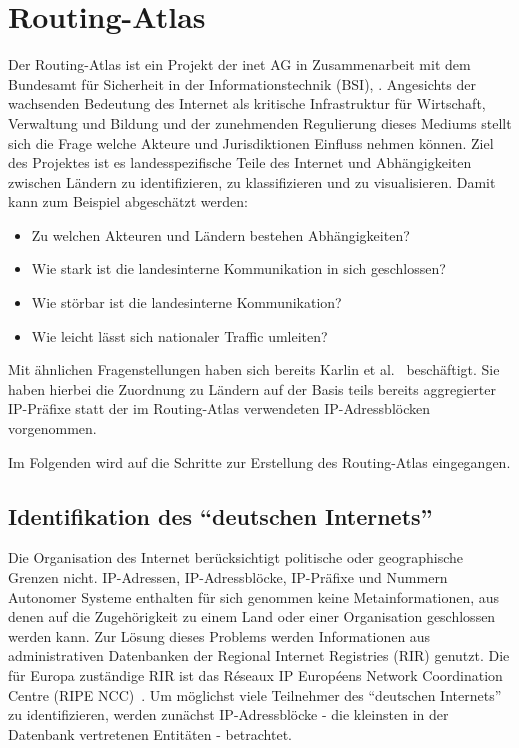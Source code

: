 \section{Routing-Atlas}\label{sec:atlas}

Der Routing-Atlas ist ein Projekt der inet AG in Zusammenarbeit mit dem Bundesamt für Sicherheit in der Informationstechnik (BSI), \vgl \cite{waehlisch2010towards,waehlisch2010framework,schmidt2010}.
Angesichts der wachsenden Bedeutung des Internet als kritische Infrastruktur für Wirtschaft, Verwaltung und Bildung und der zunehmenden Regulierung dieses Mediums stellt sich die Frage welche Akteure und Jurisdiktionen Einfluss nehmen können.
Ziel des Projektes ist es landesspezifische Teile des Internet und Abhängigkeiten zwischen Ländern zu identifizieren, zu klassifizieren und zu visualisieren.
Damit kann zum Beispiel abgeschätzt werden:
\begin{itemize}
 \item Zu welchen Akteuren und Ländern bestehen Abhängigkeiten?
 \item Wie stark ist die landesinterne Kommunikation in sich geschlossen?
 \item Wie störbar ist die landesinterne Kommunikation?
 \item Wie leicht lässt sich nationaler Traffic umleiten?
\end{itemize}

Mit ähnlichen Fragenstellungen haben sich bereits Karlin et al.~\cite{0903.3218v1} beschäftigt.
Sie haben hierbei die Zuordnung zu Ländern auf der Basis teils bereits aggregierter IP-Präfixe statt der im Routing-Atlas verwendeten IP-Adressblöcken vorgenommen.

Im Folgenden wird auf die Schritte zur Erstellung des Routing-Atlas eingegangen.

\subsection{Identifikation des "`deutschen Internets"'}
Die Organisation des Internet berücksichtigt politische oder geographische Grenzen nicht.
IP-Adressen, IP-Adressblöcke, IP-Präfixe und Nummern Autonomer Systeme enthalten für sich genommen keine Metainformationen, aus denen auf die Zugehörigkeit zu einem Land oder einer Organisation geschlossen werden kann.
Zur Lösung dieses Problems werden Informationen aus administrativen Datenbanken der Regional Internet Registries (RIR) genutzt.
Die für Europa zuständige RIR ist das Réseaux IP Européens Network Coordination Centre (RIPE NCC)~\cite{RIPE}.
Um möglichst viele Teilnehmer des "`deutschen Internets"' zu identifizieren, werden zunächst IP-Adressblöcke - die kleinsten in der Datenbank vertretenen Entitäten - betrachtet.

